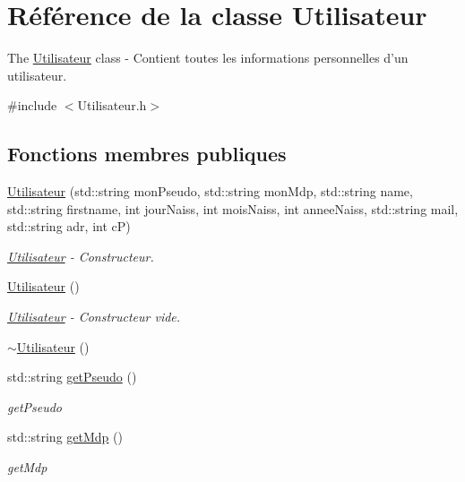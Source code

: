 \hypertarget{class_utilisateur}{\section{Référence de la classe Utilisateur}
\label{class_utilisateur}
}


The \hyperlink{class_utilisateur}{Utilisateur} class -\/ Contient toutes les informations personnelles d'un utilisateur.  




{\ttfamily \#include $<$Utilisateur.\-h$>$}

\subsection*{Fonctions membres publiques}
\begin{DoxyCompactItemize}
\item 
\hyperlink{class_utilisateur_ac0d1108ddcc0db26aa0000fb7c9760c4}{Utilisateur} (std\-::string mon\-Pseudo, std\-::string mon\-Mdp, std\-::string name, std\-::string firstname, int jour\-Naiss, int mois\-Naiss, int annee\-Naiss, std\-::string mail, std\-::string adr, int c\-P)
\begin{DoxyCompactList}\small\item\em \hyperlink{class_utilisateur}{Utilisateur} -\/ Constructeur. \end{DoxyCompactList}\item 
\hyperlink{class_utilisateur_ae76433a6d353c5f5ad0c6a6af64022ad}{Utilisateur} ()
\begin{DoxyCompactList}\small\item\em \hyperlink{class_utilisateur}{Utilisateur} -\/ Constructeur vide. \end{DoxyCompactList}\item 
\hyperlink{class_utilisateur_a6631539ceecd6140fe525eb91485537b}{$\sim$\-Utilisateur} ()
\item 
std\-::string \hyperlink{class_utilisateur_a02ffb896b7d7d34ced83b8caeea0aadd}{get\-Pseudo} ()
\begin{DoxyCompactList}\small\item\em get\-Pseudo \end{DoxyCompactList}\item 
std\-::string \hyperlink{class_utilisateur_ab42b795fd2bffc3f9be4b4833bd42973}{get\-Mdp} ()
\begin{DoxyCompactList}\small\item\em get\-Mdp \end{DoxyCompactList}\item 

\end{DoxyCompactItemize}
